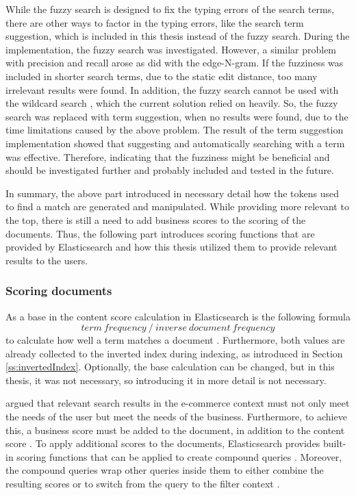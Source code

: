 While the fuzzy search is designed to fix the typing errors of the search terms, 
there are other ways to factor in the typing errors, 
like the search term suggestion, which is included in this thesis instead of the fuzzy search.
During the implementation, the fuzzy search was investigated.
However, a similar problem with precision and recall arose as did with the edge-N-gram. 
If the fuzziness was included in shorter search terms, 
due to the static edit distance, too many irrelevant results were found.
In addition, the fuzzy search cannot be used with the wildcard search \cite{elasticIntro},
which the current solution relied on heavily.
So, the fuzzy search was replaced with term suggestion, when no results were found, due to the time limitations
caused by the above problem.
The result of the term suggestion implementation showed that suggesting and automatically searching with a 
term was effective.
Therefore, indicating that the fuzziness might be beneficial and should be investigated further and probably included and tested 
in the future.


In summary, the above part introduced in necessary detail how the tokens used to find a match are generated and manipulated.
While providing more relevant to the top, there is still a need to add business scores to the scoring of the documents.
Thus, the following part introduces scoring functions that are provided by Elasticsearch and 
how this thesis utilized them to provide relevant results to the users.


\subsubsection{Scoring documents}


As a base in the content score calculation in Elasticsearch is the following formula
\[ term\ frequency\ /\ inverse\ document\ frequency \]
to calculate how well a term matches a document \cite{relevantSearch}.
Furthermore, both values are already collected to the inverted index during indexing, as introduced 
in Section \ref{ss:invertedIndex}.
Optionally, the base calculation can be changed, but in this thesis, it was not necessary, so introducing it
in more detail is not necessary.


\citeauthor{relevantSearch} \cite{relevantSearch} argued that relevant search results in the e-commerce
context must not only meet the needs of the user but meet the needs of the business.
Furthermore, to achieve this, a business score must be added to the document, in addition to the content score
\cite{relevantSearch}.
To apply additional scores to the documents, Elasticsearch provides built-in scoring functions
that can be applied to create compound queries \cite{elasticIntro}.
Moreover, the compound queries wrap other queries inside them to either combine the resulting scores
or to switch from the query to the filter context \cite{elasticIntro}.


